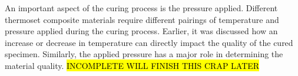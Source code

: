 An important aspect of the curing process is the pressure applied.  Different thermoset composite materials require different pairings of temperature and pressure applied during the curing process.  Earlier, it was discussed how an increase or decrease in temperature can directly impact the quality of the cured specimen.  Similarly, the applied pressure has a major role in determining the material quality. \hl{INCOMPLETE WILL FINISH THIS CRAP LATER}